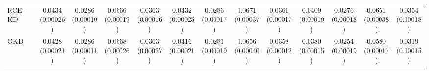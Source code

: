 \begin{table}[t]
\begin{tabular}{lcccccccccccc}
RCE-KD & \shortstack[c]{0.0434\\[-1pt]{\tiny(0.00026)}} & \shortstack[c]{0.0286\\[-1pt]{\tiny(0.00010)}} & \shortstack[c]{0.0666\\[-1pt]{\tiny(0.00019)}} & \shortstack[c]{0.0363\\[-1pt]{\tiny(0.00016)}} & \shortstack[c]{0.0432\\[-1pt]{\tiny(0.00025)}} & \shortstack[c]{0.0286\\[-1pt]{\tiny(0.00017)}} & \shortstack[c]{0.0671\\[-1pt]{\tiny(0.00037)}} & \shortstack[c]{0.0361\\[-1pt]{\tiny(0.00017)}} & \shortstack[c]{0.0409\\[-1pt]{\tiny(0.00019)}} & \shortstack[c]{0.0276\\[-1pt]{\tiny(0.00018)}} & \shortstack[c]{0.0651\\[-1pt]{\tiny(0.00038)}} & \shortstack[c]{0.0354\\[-1pt]{\tiny(0.00018)}} \\
GKD & \shortstack[c]{0.0428\\[-1pt]{\tiny(0.00021)}} & \shortstack[c]{0.0286\\[-1pt]{\tiny(0.00011)}} & \shortstack[c]{0.0668\\[-1pt]{\tiny(0.00026)}} & \shortstack[c]{0.0363\\[-1pt]{\tiny(0.00027)}} & \shortstack[c]{0.0416\\[-1pt]{\tiny(0.00021)}} & \shortstack[c]{0.0281\\[-1pt]{\tiny(0.00019)}} & \shortstack[c]{0.0656\\[-1pt]{\tiny(0.00040)}} & \shortstack[c]{0.0358\\[-1pt]{\tiny(0.00012)}} & \shortstack[c]{0.0380\\[-1pt]{\tiny(0.00015)}} & \shortstack[c]{0.0254\\[-1pt]{\tiny(0.00019)}} & \shortstack[c]{0.0580\\[-1pt]{\tiny(0.00017)}} & \shortstack[c]{0.0319\\[-1pt]{\tiny(0.00015)}} \\

\end{tabular}
\end{table}
